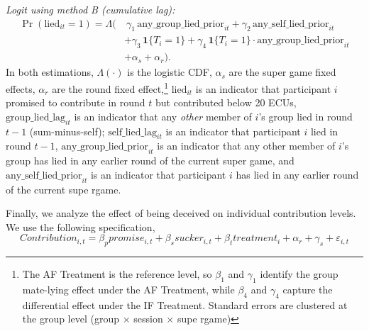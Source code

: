 \documentclass[12pt,letterpaper,english]{article}
\begin{document}
\noindent\emph{Logit using method B (cumulative lag):}
\begin{align}
\Pr(\text{lied}_{it} = 1) = \Lambda\Big(
  &\ \gamma_1\, \text{any\_group\_lied\_prior}_{it}
   + \gamma_2\, \text{any\_self\_lied\_prior}_{it} \nonumber \\
  &+ \gamma_3\, \mathbf{1}\{T_i = 1\}
   + \gamma_4\, \mathbf{1}\{T_i = 1\} \cdot \text{any\_group\_lied\_prior}_{it} \nonumber \\
  &+ \alpha_s + \alpha_r \Big).
\end{align}
In both estimations, 
$\Lambda(\cdot)$ is the logistic CDF, 
$\alpha_s$ are the super game fixed effects, 
$\alpha_r$ are the round fixed effect,\footnote{The AF Treatment is the reference level, so $\beta_1$ and $\gamma_1$ identify the group mate-lying effect under the AF Treatment, while $\beta_4$ and $\gamma_4$ capture the differential effect under the IF Treatment. Standard errors are clustered at the group level (group $\times$ session $\times$ supe rgame)}
$\text{lied}_{it}$ is an indicator that participant $i$ promised to contribute in round $t$ but contributed below 20 ECUs,
$\text{group\_lied\_lag}_{it}$ is an indicator that any \emph{other} member of $i$'s group lied in round $t{-}1$ (sum-minus-self);
$\text{self\_lied\_lag}_{it}$ is an indicator that participant $i$ lied in round $t{-}1$,
$\text{any\_group\_lied\_prior}_{it}$ is an indicator that any other member of $i$'s group has lied in any earlier round of the current super game, and 
$\text{any\_self\_lied\_prior}_{it}$ is an indicator that participant $i$ has lied in any earlier round of the current supe rgame.


\begin{table}[htbp]
    \centering
    
    \caption{Pooled logit of own round-$t$ lying on groupmates' prior lying, interacted with treatment. Column (1) uses the one-round lag; column (2) uses a cumulative indicator for any prior-round lying within the current supergame. supergame and round fixed effects included; standard errors clustered at the group level. AF Treatment is the reference. The bottom two rows report the joint Wald test that the total groupmate-lying effect under IF Treatment (main coefficient plus the Treatment~1 interaction) is zero.}
    \label{table:lying_contagion}
\end{table}

Finally, we analyze the effect of being deceived on individual contribution levels. We use the following specification,
\begin{equation}
    Contribution_{i,t} = \beta_p promise_{i,t} + \beta_s sucker_{i,t} + \beta_t treatment_{i} + \alpha_r + \gamma_s + \varepsilon_{i,t}
\label{eq:contribution_regression}
\end{equation}
\end{document}
